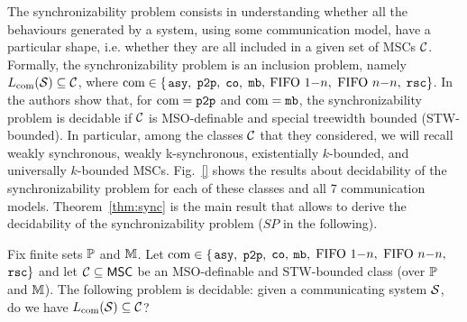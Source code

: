 The synchronizability problem consists in understanding whether all the behaviours generated by a system, using some communication model, have a particular shape, i.e.  whether they are all included in a given set of MSCs $\mathcal{C}$. Formally, the synchronizability problem is an inclusion problem, namely $L_{\textup{com}}(\mathcal{S}) \subseteq \mathcal{C}$, where $\textup{com} \in \{$$\mathtt{asy}, $ $\mathtt{p2p}, $ $\mathtt{co}, $ $\mathtt{mb}, $ $\text{FIFO } 1\mathsf{-}n, $ $\text{FIFO } n\mathsf{-}n, $ $\mathtt{rsc}\}$. In \cite{BolligFG21} the authors show that, for $\textup{com} = \mathtt{p2p}$ and $\textup{com} = \mathtt{mb}$, the synchronizability problem is decidable if $\mathcal{C}$ is MSO-definable and special treewidth bounded (STW-bounded). In particular, among the classes $\mathcal{C}$ that they considered, we will recall weakly synchronous, weakly k-synchronous, existentially $k$-bounded, and universally $k$-bounded MSCs. Fig.~\ref{} shows the results about decidability of the synchronizability problem for each of these classes and all 7 communication models. Theorem~\ref{thm:sync} is the main result that allows to derive the decidability of the synchronizability problem ($SP$ in the following). 

\begin{theorem}\label{thm:sync}
	Fix finite sets $\mathbb{P}$ and $\mathbb{M}$.
	Let $\textup{com} \in \{$$\mathtt{asy}, $ $\mathtt{p2p}, $ $\mathtt{co}, $ $\mathtt{mb}, $ $\text{FIFO } 1\mathsf{-}n, $ $\text{FIFO } n\mathsf{-}n, $ $\mathtt{rsc}\}$ and let $\mathcal{C} \subseteq \mathsf{MSC}$ be an MSO-definable and STW-bounded class (over $\mathbb{P}$ and $\mathbb{M}$).
	The following problem is decidable:
	given a communicating system $\mathcal{S}$, do we have $L_{\textup{com}}(\mathcal{S}) \subseteq \mathcal{C}$?
\end{theorem}






